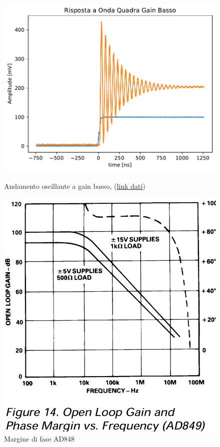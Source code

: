 \begin{figure}[!h]
    \begin{minipage}{.5\linewidth}
        \centering
        \includegraphics[width=.8\linewidth]{analog/assets/AD848/Non Invertente/Non_inv_low_gain.pdf}
        \caption{Andamento oscillante a gain basso, (\href{https://github.com/Yedi278/Esperimentazioni-Elettronica/tree/main/-\%20OPAMP/AD848/Non-Invertente/R1\%202.2k\%20R2\%202.2k}{link dati})}
    \end{minipage}
    \begin{minipage}{0.5\linewidth}
        \centering
        \includegraphics[width=.6\linewidth]{analog/assets/AD848/AD848_PhaseMargin.png}
        \caption{Margine di fase AD848}
    \end{minipage}
\end{figure}

